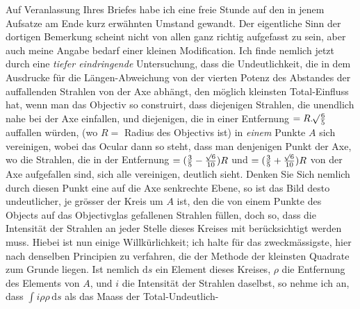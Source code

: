 Auf Veranlassung Ihres Briefes habe ich eine freie Stunde auf den in jenem Aufsatze am Ende kurz erwähnten Umstand gewandt. Der eigentliche Sinn der dortigen Bemerkung scheint nicht von allen ganz richtig aufgefasst zu sein, aber auch meine Angabe bedarf einer kleinen Modification. Ich finde nemlich jetzt durch eine \textit{tiefer eindringende} Untersuchung, dass die Undeutlichkeit, die in dem Ausdrucke für die Längen-Abweichung von der vierten Potenz des Abstandes der auffallenden Strahlen von der Axe abhängt, den möglich kleinsten Total-Einfluss hat, wenn man das Objectiv so construirt, dass diejenigen Strahlen, die unendlich nahe bei der Axe einfallen, und diejenigen, die in einer Entfernung $=R.\mathord{{}^{}\!\surd}\tfrac65$ auffallen würden, (wo $R=$ Radius des Objectivs ist) in \textit{einem} Punkte $A$ sich vereinigen, wobei das Ocular dann so steht, dass man denjenigen Punkt der Axe, wo die Strahlen, die in der Entfernung $=(\tfrac35-\tfrac{\mathord{{}^{}\!\surd}6}{10})R$ und $=(\tfrac35+\tfrac{\mathord{{}^{}\!\surd}6}{10})R$ von der Axe aufgefallen sind, sich alle vereinigen, deutlich sieht. Denken Sie Sich nemlich durch diesen Punkt eine auf die Axe senkrechte Ebene, so ist das Bild desto undeutlicher, je grösser der Kreis um $A$ ist, den die von einem Punkte des Objects auf das Objectivglas gefallenen Strahlen füllen, doch so, dass die Intensität der Strahlen an jeder Stelle dieses Kreises mit berücksichtigt werden muss. Hiebei ist nun einige Willkürlichkeit; ich halte für das zweckmässigste, hier nach denselben Principien zu verfahren, die der Methode der kleinsten Quadrate zum Grunde liegen. Ist nemlich $\mathrm{d}s$ ein Element dieses Kreises, $\rho$ die Entfernung des Elements von $A$, und $i$ die Intensität der Strahlen daselbst, so nehme ich an, dass $\int i\rho\rho\,\mathrm{d}s$ als das Maass der Total-Undeutlich-
\par\clearpage
{}
